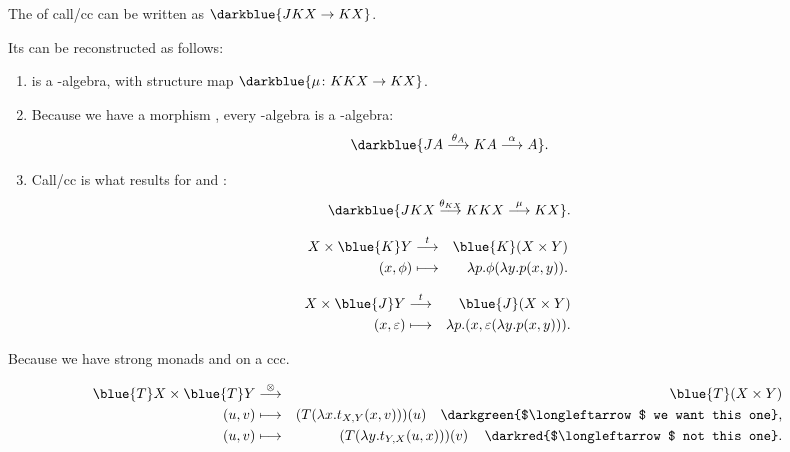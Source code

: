 \documentclass%
[%
Screen4to3,
]{foils}
\begin{document}
The  of call/cc can be written as $\darkblue{J K X \to K X}$. \\

\vfill

Its  can be reconstructed as follows:
\begin{enumerate}
\item[\grey{1.}]  is a -algebra, with structure map
  $\darkblue{\mu \colon K K X \to K X}$.
\item[\grey{2.}] Because we have a morphism , every
  -algebra is a -algebra:
\[
\darkblue{J A \stackrel{\theta_A}{\longrightarrow} K A \stackrel{\alpha}{\longrightarrow} A}.
\]
\item[\grey{3.}] Call/cc is what results for  and \darkblue{$\alpha = \mu$}:
\[
\darkblue{J K X \stackrel{\theta_{K X}}{\longrightarrow} K K X \stackrel{\mu}{\longrightarrow} K X}.
\]
\end{enumerate}


\begin{eqnarray*}
  X \times  \blue{K} Y & \stackrel{t}{\longrightarrow} & \blue{K}(X \times Y) \\
  (x, \phi) & \longmapsto & \lambda p.\phi(\lambda y.p(x,y)).
\end{eqnarray*}


\begin{eqnarray*}
  X \times  \blue{J} Y & \stackrel{t}{\longrightarrow} & \blue{J}(X \times Y) \\
  (x, \varepsilon) & \longmapsto & \lambda p.(x,\varepsilon(\lambda y.p(x,y))).
\end{eqnarray*}



Because we have strong monads  and  on
a ccc.

\begin{eqnarray*}
\blue{T} X \times \blue{T} Y & \stackrel{\otimes}{\longrightarrow} & \blue{T} (X \times Y ) \\
(u, v) & \longmapsto & (T (\lambda x.t_{X,Y}(x, v)))(u) \text{~~~\darkgreen{$\longleftarrow$ we want this one},}\\
(u, v) & \longmapsto & (T (\lambda y.t_{Y,X}(u, x)))(v) \text{~~~\,\darkred{$\longleftarrow$ not this one}.} \\
\end{eqnarray*}
\end{document}
